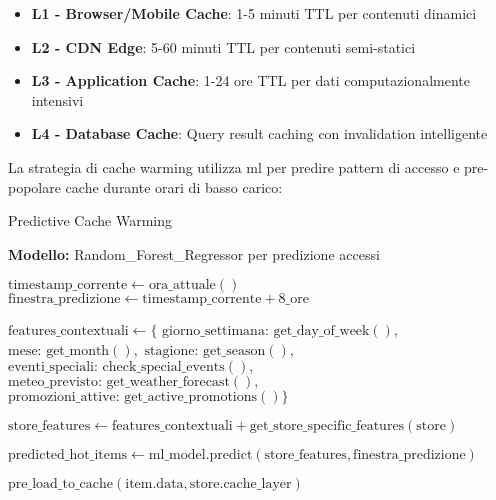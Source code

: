 \begin{itemize}
    \item \textbf{L1 - Browser/Mobile Cache}: 1-5 minuti TTL per contenuti dinamici
    \item \textbf{L2 - CDN Edge}: 5-60 minuti TTL per contenuti semi-statici
    \item \textbf{L3 - Application Cache}: 1-24 ore TTL per dati computazionalmente intensivi
    \item \textbf{L4 - Database Cache}: Query result caching con invalidation intelligente
\end{itemize}

La strategia di cache warming utilizza \gls{ml} per predire pattern di accesso e pre-popolare cache durante orari di basso carico:

\begin{algorithm}[H]
\caption{Predictive Cache Warming}
\label{alg:predictive-cache-warming}
\begin{algorithmic}[1]
\State \textbf{Modello:} Random\_Forest\_Regressor per predizione accessi

    \State $\text{timestamp\_corrente} \leftarrow \text{ora\_attuale}()$
    \State $\text{finestra\_predizione} \leftarrow \text{timestamp\_corrente} + 8\_\text{ore}$
    
    \State $\text{features\_contextuali} \leftarrow \{$
    \State \hspace{2em} $\text{giorno\_settimana: get\_day\_of\_week}(),$
    \State \hspace{2em} $\text{mese: get\_month}(),$
    \State \hspace{2em} $\text{stagione: get\_season}(),$
    \State \hspace{2em} $\text{eventi\_speciali: check\_special\_events}(),$
    \State \hspace{2em} $\text{meteo\_previsto: get\_weather\_forecast}(),$
    \State \hspace{2em} $\text{promozioni\_attive: get\_active\_promotions}()\}$
    
        \State $\text{store\_features} \leftarrow \text{features\_contextuali} + \text{get\_store\_specific\_features}(\text{store})$
        
        \State $\text{predicted\_hot\_items} \leftarrow \text{ml\_model.predict}(\text{store\_features}, \text{finestra\_predizione})$
        
                \State $\text{pre\_load\_to\_cache}(\text{item.data}, \text{store.cache\_layer})$
                

\end{algorithmic}
\end{algorithm}

